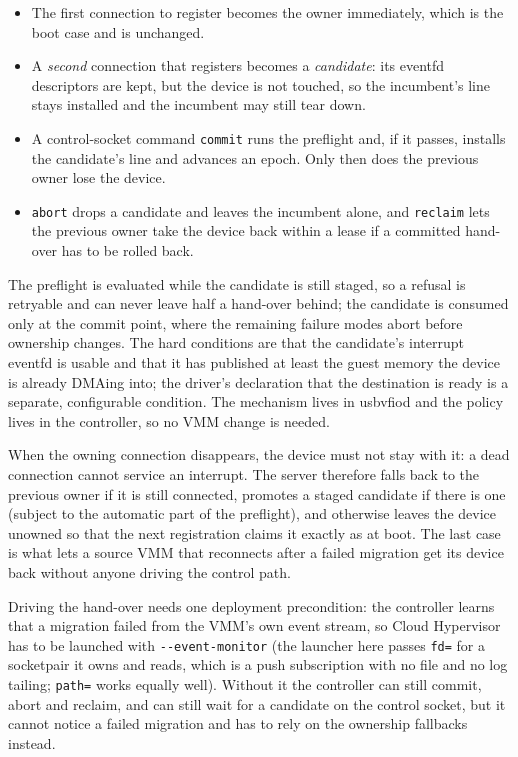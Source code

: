 \documentclass[10pt,conference]{IEEEtran}
\newcommand{\code}[1]{\texttt{#1}}
\begin{document}
\begin{itemize}
\item The first connection to register becomes the owner immediately, which is
      the boot case and is unchanged.
\item A \emph{second} connection that registers becomes a \emph{candidate}: its
      eventfd descriptors are kept, but the device is not touched, so the
      incumbent's line stays installed and the incumbent may still tear down.
\item A control-socket command \code{commit} runs the preflight and, if it
      passes, installs the candidate's line and advances an epoch. Only then does
      the previous owner lose the device.
\item \code{abort} drops a candidate and leaves the incumbent alone, and
      \code{reclaim} lets the previous owner take the device back within a lease
      if a committed hand-over has to be rolled back.
\end{itemize}

The preflight is evaluated while the candidate is still staged, so a refusal is
retryable and can never leave half a hand-over behind; the candidate is consumed
only at the commit point, where the remaining failure modes abort before
ownership changes. The hard conditions are that the candidate's interrupt
eventfd is usable and that it has published at least the guest memory the device
is already DMAing into; the driver's declaration that the destination is ready
is a separate, configurable condition. The mechanism lives in usbvfiod and the
policy lives in the controller, so no VMM change is needed.

When the owning connection disappears, the device must not stay with it: a dead
connection cannot service an interrupt. The server therefore falls back to the
previous owner if it is still connected, promotes a staged candidate if there is
one (subject to the automatic part of the preflight), and otherwise leaves the
device unowned so that the next registration claims it exactly as at boot. The
last case is what lets a source VMM that reconnects after a failed migration get
its device back without anyone driving the control path.

Driving the hand-over needs one deployment precondition: the controller
learns that a migration failed from the VMM's own event stream, so Cloud
Hypervisor has to be launched with \code{-{}-event-monitor} (the launcher here
passes \code{fd=} for a socketpair it owns and reads, which is a push
subscription with no file and no log tailing; \code{path=} works equally well).
Without it the controller can still commit, abort and reclaim, and can still
wait for a candidate on the control socket, but it cannot notice a failed
migration and has to rely on the ownership fallbacks instead.
\end{document}
